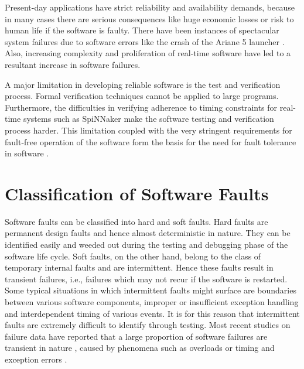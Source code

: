 \documentclass[oneside, a4paper, 11pt]{memoir}
\begin{document}
Present-day applications have strict reliability and availability demands, because in many cases there are serious consequences like huge economic losses or risk to human life if the software is faulty. There have been instances of spectacular system failures due to software errors like the crash of the Ariane 5 launcher \citep{lions1996ariane}. Also, increasing complexity and proliferation of real-time software have led to a resultant increase in software failures.

A major limitation in developing reliable software is the test and verification process. Formal verification techniques cannot be applied to large programs. Furthermore, the difficulties in verifying adherence to timing constraints for real-time systems such as SpiNNaker make the software testing and verification process harder. This limitation coupled with the very stringent requirements for fault-free operation of the software form the basis for the need for fault tolerance in software \citep{trivedi2008software}.

\section{Classification of Software Faults}

Software faults can be classified into hard and soft faults. Hard faults are permanent design faults and hence almost deterministic in nature. They can be identified easily and weeded out during the testing and debugging phase of the software life cycle. Soft faults, on the other hand, belong to the class of temporary internal faults and are intermittent. Hence these faults result in transient failures, i.e., failures which may not recur if the software is restarted. Some typical situations in which intermittent faults might surface are boundaries between various software components, improper or insufficient exception handling and interdependent timing of various events. It is for this reason that intermittent faults are extremely difficult to identify through testing. Most recent studies on failure data have reported that a large proportion of software failures are transient in nature \citep{gray1990census}, caused by phenomena such as overloads or timing and exception errors \citep{chillarege1995measurement}.
\end{document}
